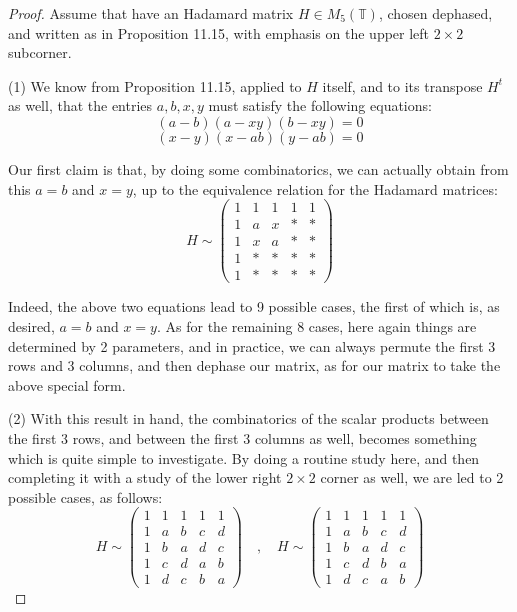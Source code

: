 \documentclass[12pt]{amsbook}
\begin{document}
\begin{proof}
Assume that have an Hadamard matrix $H\in M_5(\mathbb T)$, chosen dephased, and written as in Proposition 11.15, with emphasis on the upper left $2\times2$ subcorner.

\medskip

(1) We know from Proposition 11.15, applied to $H$ itself, and to its transpose $H^t$ as well, that the entries $a,b,x,y$ must satisfy the following equations:
$$(a-b)(a-xy)(b-xy)=0$$
$$(x-y)(x-ab)(y-ab)=0$$

Our first claim is that, by doing some combinatorics, we can actually obtain from this $a=b$ and $x=y$, up to the equivalence relation for the Hadamard matrices: 
$$H\sim\begin{pmatrix}
1&1&1&1&1\\
1&a&x&*&*\\
1&x&a&*&*\\
1&*&*&*&*\\
1&*&*&*&*
\end{pmatrix}$$

Indeed, the above two equations lead to 9 possible cases, the first of which is, as desired, $a=b$ and $x=y$. As for the remaining 8 cases, here again things are determined by 2 parameters, and in practice, we can always permute the first 3 rows and 3 columns, and then dephase our matrix, as for our matrix to take the above special form.

\medskip

(2) With this result in hand, the combinatorics of the scalar products between the first 3 rows, and between the first 3 columns as well, becomes something which is quite simple to investigate. By doing a routine study here, and then completing it with a study of the lower right $2\times2$ corner as well, we are led to 2 possible cases, as follows:
$$H\sim\begin{pmatrix}
1&1&1&1&1\\
1&a&b&c&d\\
1&b&a&d&c\\
1&c&d&a&b\\
1&d&c&b&a
\end{pmatrix}\quad,\quad 
H\sim\begin{pmatrix}
1&1&1&1&1\\
1&a&b&c&d\\
1&b&a&d&c\\
1&c&d&b&a\\
1&d&c&a&b
\end{pmatrix}$$


\end{proof}
\end{document}
